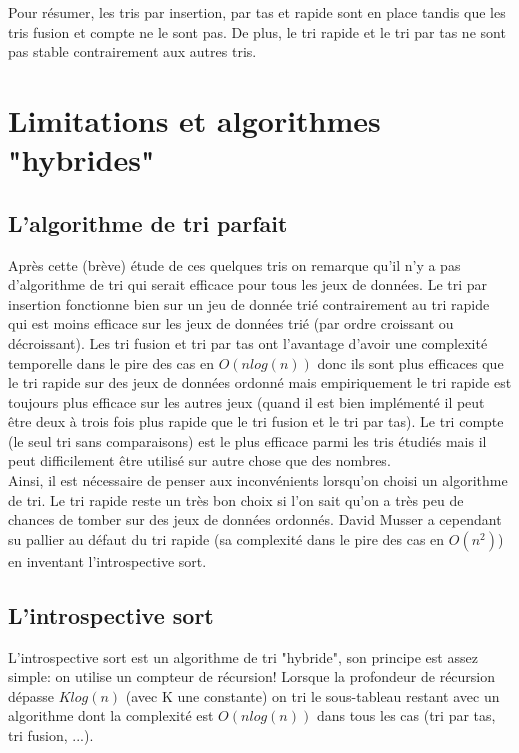 \documentclass[12pt]{article}
\begin{document}
			Pour résumer, les tris par insertion, par tas et rapide sont en place tandis que les tris fusion et compte ne le sont pas. De plus, le tri rapide et le tri par tas ne sont pas stable contrairement aux autres tris.
			
	\section{Limitations et algorithmes "hybrides"}
		\subsection{L'algorithme de tri parfait}
			Après cette (brève) étude de ces quelques tris on remarque qu'il n'y a pas d'algorithme de tri qui serait efficace pour tous les jeux de données. Le tri par insertion fonctionne bien sur un jeu de donnée trié contrairement au tri rapide qui est moins efficace sur les jeux de données trié (par ordre croissant ou décroissant). Les tri fusion et tri par tas ont l'avantage d'avoir une complexité temporelle dans le pire des cas en $O(nlog(n))$ donc ils sont plus efficaces que le tri rapide sur des jeux de données ordonné mais empiriquement le tri rapide est toujours plus efficace sur les autres jeux (quand il est bien implémenté il peut être deux à trois fois plus rapide que le tri fusion et le tri par tas). Le tri compte (le seul tri sans comparaisons) est le plus efficace parmi les tris étudiés mais il peut difficilement être utilisé sur autre chose que des nombres. \\
			
			Ainsi, il est nécessaire de penser aux inconvénients lorsqu'on choisi un algorithme de tri. Le tri rapide reste un très bon choix si l'on sait qu'on a très peu de chances de tomber sur des jeux de données ordonnés. David Musser a cependant su pallier au défaut du tri rapide (sa complexité dans le pire des cas en $O(n^2)$) en inventant l'introspective sort.
		
		\subsection{L'introspective sort}
			L'introspective sort est un algorithme de tri "hybride", son principe est assez simple: on utilise un compteur de récursion! Lorsque la profondeur de récursion dépasse $K log(n)$ (avec K une constante) on tri le sous-tableau restant avec un algorithme dont la complexité est $O(n log(n))$ dans tous les cas (tri par tas, tri fusion, ...). \\
			
\end{document}
